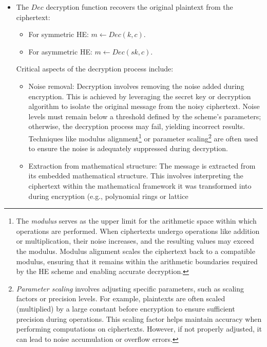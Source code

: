 \documentclass[
  letterpaper,
  DIV=11,
  numbers=noendperiod,
  oneside]{scrartcl}
\begin{document}
\begin{itemize}
\item
  The \(Dec\) decryption function recovers the original plaintext from
  the ciphertext:

  \begin{itemize}
  \item
    For symmetric HE: \(m \leftarrow Dec(k, c)\).
  \item
    For asymmetric HE: \(m \leftarrow Dec(sk, c)\).
  \end{itemize}

  Critical aspects of the decryption process include:

  \begin{itemize}
  \item
    Noise removal: Decryption involves removing the noise added during
    encryption. This is achieved by leveraging the secret key or
    decryption algorithm to isolate the original message from the noisy
    ciphertext. Noise levels must remain below a threshold defined by
    the scheme's parameters; otherwise, the decryption process may fail,
    yielding incorrect results. Techniques like modulus
    alignment\footnote{The \emph{modulus} serves as the upper limit for
      the arithmetic space within which operations are performed. When
      ciphertexts undergo operations like addition or multiplication,
      their noise increases, and the resulting values may exceed the
      modulus. Modulus alignment scales the ciphertext back to a
      compatible modulus, ensuring that it remains within the arithmetic
      boundaries required by the HE scheme and enabling accurate
      decryption.} or parameter scaling\footnote{\emph{Parameter
      scaling} involves adjusting specific parameters, such as scaling
      factors or precision levels. For example, plaintexts are often
      scaled (multiplied) by a large constant before encryption to
      ensure sufficient precision during operations. This scaling factor
      helps maintain accuracy when performing computations on
      ciphertexts. However, if not properly adjusted, it can lead to
      noise accumulation or overflow errors.} are often used to ensure
    the noise is adequately suppressed during decryption.
  \item
    Extraction from mathematical structure: The message is extracted
    from its embedded mathematical structure. This involves interpreting
    the ciphertext within the mathematical framework it was transformed
    into during encryption (e.g., polynomial rings or lattice

\end{itemize}
\end{itemize}
\end{document}
